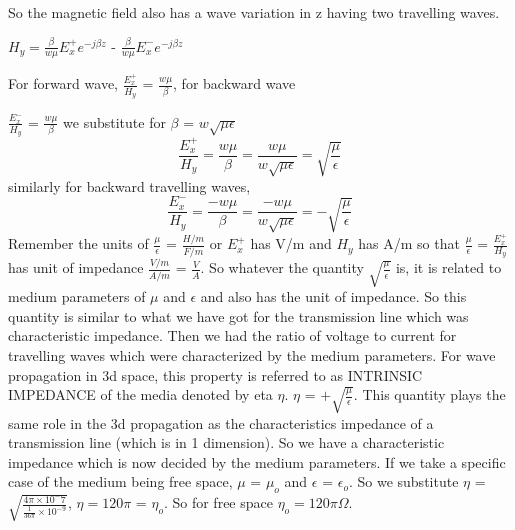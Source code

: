 So the magnetic field also has a wave variation in z having two travelling waves. 

$H_y = \frac{\beta}{w\mu}E_x^{+}e^{-j\beta z}$ - $\frac{\beta}{w\mu}E_x^{-}e^{-j\beta z}$

For forward wave, $\frac{E_x^+}{H_y}$ = $\frac{w\mu}{\beta}$, for backward wave 

$\frac{E_x^-}{H_y}$ = $\frac{w\mu}{\beta}$
we substitute for $\beta$ = $w\sqrt{\mu\epsilon}$
\begin{dmath*}
\frac{E_x^+}{H_y} = \frac{w\mu}{\beta} = \frac{w\mu}{w\sqrt{\mu\epsilon}} = {\sqrt{\frac{\mu}{\epsilon}}}
\end{dmath*}
similarly for backward travelling waves,
\begin{dmath*}
\frac{E_x^-}{H_y} = \frac{-w\mu}{\beta} = \frac{-w\mu}{w\sqrt{\mu\epsilon}} = {-\sqrt{\frac{\mu}{\epsilon}}}
\end{dmath*}
Remember the units of $\frac{\mu}{\epsilon}$ = $\frac{H/m}{F/m}$ or $E_x^+$ has V/m and $H_y$ has A/m so that $\frac{\mu}{\epsilon}$ = $\frac{E_x^+}{H_y}$ has unit of impedance $\frac{V/m}{A/m}$ = $\frac{V}{A}$. So whatever the quantity ${\sqrt{\frac{\mu}{\epsilon}}}$ is, it is related to medium parameters of $\mu$ and $\epsilon$ and also has the unit of impedance. So this quantity is similar to what we have got for the transmission line which was characteristic impedance. Then we had the ratio of voltage to current for travelling waves which were characterized by the medium parameters. For wave propagation in 3d space, this property is referred to as INTRINSIC IMPEDANCE of the media denoted by eta $\eta$. $\eta$ = ${+\sqrt{\frac{\mu}{\epsilon}}}$. This quantity plays the same role in the 3d propagation as the characteristics impedance of a transmission line (which is in 1 dimension). So we have a characteristic impedance which is now decided by the medium parameters. If we take a specific case of the medium being free space, $\mu$ = $\mu_{o}$ and $\epsilon$ = $\epsilon_{o}$. So we substitute $\eta$ =$\sqrt{\frac{4\pi \times 10^-7}{\frac{1}{36\pi} \times 10^{-9}}}$, $\eta = 120\pi$ = $\eta_{o}$. So for free space $\eta_{o} = 120\pi$$\Omega$.

